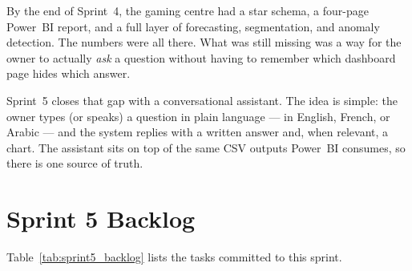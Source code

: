 By the end of Sprint~4, the gaming centre had a star schema, a four-page
Power~BI report, and a full layer of forecasting, segmentation, and
anomaly detection. The numbers were all there. What was still missing was
a way for the owner to actually \emph{ask} a question without having to
remember which dashboard page hides which answer.

Sprint~5 closes that gap with a conversational assistant. The idea is
simple: the owner types (or speaks) a question in plain language --- in
English, French, or Arabic --- and the system replies with a written
answer and, when relevant, a chart. The assistant sits on top of the same
CSV outputs Power~BI consumes, so there is one source of truth.

\section{Sprint 5 Backlog}

Table~\ref{tab:sprint5_backlog} lists the tasks committed to this sprint.

